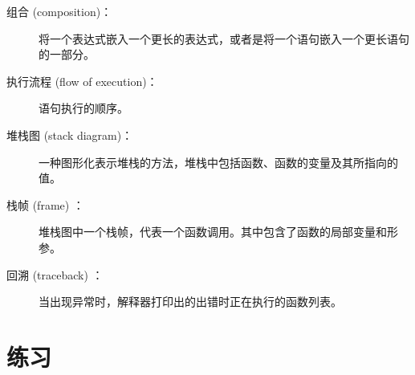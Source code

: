 \begin{description}
\item[组合 (composition)：] 将一个表达式嵌入一个更长的表达式，或者是将一个语句嵌入一个更长语句的一部分。
  


\item[执行流程 (flow of execution)：] 语句执行的顺序。
  


\item[堆栈图 (stack diagram)：] 一种图形化表示堆栈的方法，堆栈中包括函数、函数的变量及其所指向的值。
  


\item[栈帧 (frame) ：] 堆栈图中一个栈帧，代表一个函数调用。其中包含了函数的局部变量和形参。
  
  


\item[回溯 (traceback) ：] 当出现异常时，解释器打印出的出错时正在执行的函数列表。
  

\end{description}


%
\section{练习}

